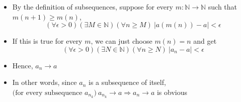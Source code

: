 \documentclass{article}
\begin{document}
\begin{itemize}
\begin{itemize}
        \begin{itemize}
            \item By the definition of subsequences, suppose for every $m : \mathbb{N} \rightarrow \mathbb{N}$ such that $m(n+1) \ge m(n)$,
            \[ (\forall \epsilon > 0)(\exists M \in \mathbb{N})(\forall n \ge M) \ \vert a(m(n)) - a \vert < \epsilon \]
            \item If this is true for every $m$, we can just choose $m(n)=n$ and get
            \[ (\forall \epsilon > 0)(\exists N \in \mathbb{N})(\forall n \ge N) \ \vert a_n - a \vert < \epsilon \]
            \item Hence, $a_n \rightarrow a$
            \item In other words, since $a_n$ is a subsequence of itself, $\text{(for every subsequence } a_{n_k}) \ a_{n_k} \rightarrow a \Rightarrow a_n \rightarrow a$ is obvious
        \end{itemize}
       

\end{itemize}
\end{itemize}
\end{document}
